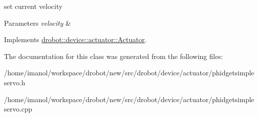 set current velocity 


\begin{DoxyParams}{Parameters}
{\em velocity} & \\
\hline
\end{DoxyParams}


Implements \hyperlink{classdrobot_1_1device_1_1actuator_1_1Actuator_a452a63a9cf5daf479c12b99c3e99679c}{drobot\-::device\-::actuator\-::\-Actuator}.



The documentation for this class was generated from the following files\-:\begin{DoxyCompactItemize}
\item 
/home/imanol/workspace/drobot/new/src/drobot/device/actuator/phidgetsimpleservo.\-h\item 
/home/imanol/workspace/drobot/new/src/drobot/device/actuator/phidgetsimpleservo.\-cpp\end{DoxyCompactItemize}

